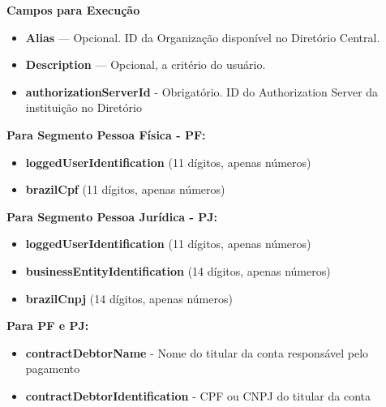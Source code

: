 \textbf{Campos para Execução}

\begin{itemize}
    \item \textbf{Alias} — Opcional. ID da Organização disponível no Diretório Central.
    \item \textbf{Description} — Opcional, a critério do usuário.
    \item \textbf{\textcolor{red!80}{authorizationServerId}} - Obrigatório. ID do Authorization Server da instituição no Diretório
\end{itemize}

\textbf{Para Segmento Pessoa Física - PF:}
\begin{itemize}
    \item \textbf{\textcolor{red!80}{loggedUserIdentification}} (11 dígitos, apenas números)
    \item \textbf{\textcolor{red!80}{brazilCpf}} (11 dígitos, apenas números)
\end{itemize}

\textbf{Para Segmento Pessoa Jurídica - PJ:}
\begin{itemize}
    \item \textbf{\textcolor{red!80}{loggedUserIdentification}} (11 dígitos, apenas números)
    \item \textbf{\textcolor{red!80}{businessEntityIdentification}} (14 dígitos, apenas números)
    \item \textbf{\textcolor{red!80}{brazilCnpj}} (14 dígitos, apenas números)
\end{itemize}

\textbf{Para PF e PJ:}
\begin{itemize}
    \item \textbf{\textcolor{red!80}{contractDebtorName}} - Nome do titular da conta responsável pelo pagamento
    \item \textbf{\textcolor{red!80}{contractDebtorIdentification}} - CPF ou CNPJ do titular da conta
\end{itemize}

